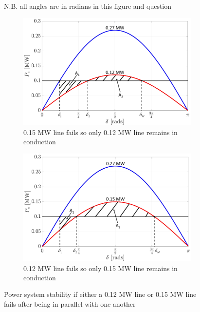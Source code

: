     \subsection{}
        \begin{figure}[tbh!]
            \centering
            \caption*{N.B. all angles are in radians in this figure and question}
            \begin{subfigure}{0.49\textwidth}
                \centering
                 \includegraphics[width=\linewidth]{PEMDT Exam Report/img/12OnlyLine.png}
                 \caption{0.15 MW line fails so only 0.12 MW line remains in conduction}
                 \label{fig: 12onlyline}
            \end{subfigure}
            \hfill
            \begin{subfigure}{0.49\textwidth}
                 \centering
                 \includegraphics[width=\linewidth]{PEMDT Exam Report/img/15OnlyLine.png}
                 \caption{0.12 MW line fails so only 0.15 MW line remains in conduction}
                 \label{fig: 15onlyline}
             \end{subfigure}
             \caption{Power system stability if either a 0.12 MW line or 0.15 MW line fails after being in parallel with one another}
             \label{fig: line loss}
             \vspace{-10mm}
        \end{figure}
